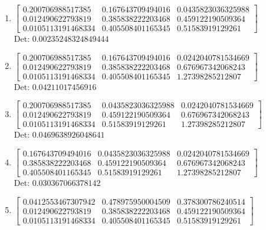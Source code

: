 \documentclass[12pt]{article}
\begin{document}
\begin{enumerate}
\item $\displaystyle \left[\begin{matrix}0.200706988517385 & 0.167643709494016 & 0.0435823036325988\\0.012490622793819 & 0.385838222203468 & 0.459122190509364\\0.0105113191468334 & 0.405508401165345 & 0.51583919129261\end{matrix}\right]$\\

Det: $0.00235248324849444$\\

\item $\displaystyle \left[\begin{matrix}0.200706988517385 & 0.167643709494016 & 0.0242040781534669\\0.012490622793819 & 0.385838222203468 & 0.676967342068243\\0.0105113191468334 & 0.405508401165345 & 1.27398285212807\end{matrix}\right]$\\

Det: $0.04211017456916$\\

\item $\displaystyle \left[\begin{matrix}0.200706988517385 & 0.0435823036325988 & 0.0242040781534669\\0.012490622793819 & 0.459122190509364 & 0.676967342068243\\0.0105113191468334 & 0.51583919129261 & 1.27398285212807\end{matrix}\right]$\\

Det: $0.0469638926048641$\\

\item $\displaystyle \left[\begin{matrix}0.167643709494016 & 0.0435823036325988 & 0.0242040781534669\\0.385838222203468 & 0.459122190509364 & 0.676967342068243\\0.405508401165345 & 0.51583919129261 & 1.27398285212807\end{matrix}\right]$\\

Det: $0.030367066378142$\\

\item $\displaystyle \left[\begin{matrix}0.0412553467307942 & 0.478975950004509 & 0.378300786240514\\0.012490622793819 & 0.385838222203468 & 0.459122190509364\\0.0105113191468334 & 0.405508401165345 & 0.51583919129261\end{matrix}\right]$\\


\end{enumerate}
\end{document}
